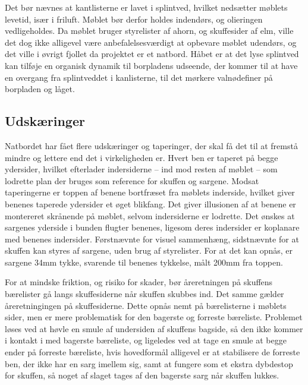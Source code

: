 Det bør nævnes at kantlisterne er lavet i splintved, hvilket nedsætter møblets
levetid, især i friluft. Møblet bør derfor holdes indendørs, og olieringen
vedligeholdes. Da møblet bruger styrelister af ahorn, og skuffesider af elm,
ville det dog ikke alligevel være anbefalelsesværdigt at opbevare møblet udendørs,
og det ville i øvrigt fjollet da projektet er et natbord. Håbet er at det lyse
splintved kan tilføje en organisk dynamik til borpladens udseende, der kommer
til at have en overgang fra splintveddet i kanlisterne, til det mørkere
valnødefiner på borpladen og låget.


\subsection*{Udskæringer}
Natbordet har fået flere udskæringer og taperinger, der skal få det til at
fremstå mindre og lettere end det i virkeligheden er. Hvert ben er taperet på
begge ydersider, hvilket  efterlader indersiderne -- ind mod resten af møblet --
som lodrette plan der bruges som reference for skuffen og sargene. Modsat
taperingerne er toppen af benene bortfræset fra møblets inderside, hvilket giver
benenes taperede ydersider et øget blikfang. Det giver illusionen af at benene
er montereret skrånende på møblet, selvom indersiderne er lodrette. Det ønskes
at sargenes yderside i bunden flugter benenes, ligesom deres indersider er
koplanare med benenes indersider. Førstnævnte for visuel sammenhæng, sidstnævnte
for at skuffen kan styres af sargene, uden brug af styrelister. For at det kan
opnås, er sargene 34mm tykke, svarende til benenes tykkelse, målt 200mm fra
toppen.

For at mindske friktion, og risiko for skader, bør åreretningen på skuffens
bærelister gå langs skuffesiderne når skuffen skubbes ind. Det samme gælder
åreretningingen på skuffesiderne. Dette opnås nemt på bærelisterne i møblets
sider, men er mere problematisk for den bagerste og forreste bæreliste.
Problemet løses ved at høvle en smule af undersiden af skuffens bagside, så den
ikke kommer i kontakt i med bagerste bæreliste, og ligeledes ved at tage en
smule at begge ender på forreste bæreliste, hvis hovedformål alligevel er at
stabilisere de forreste ben, der ikke har en sarg imellem sig, samt at fungere
som et ekstra dybdestop for skuffen, så noget af slaget tages af den
bagerste sarg når skuffen lukkes.
